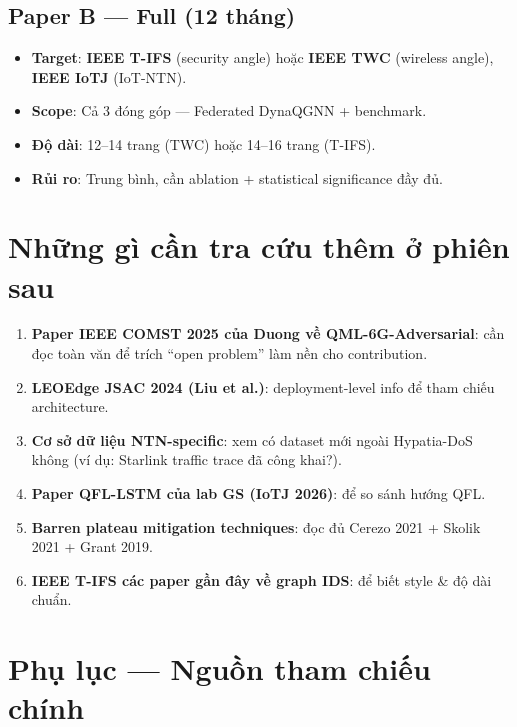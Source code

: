 \documentclass[11pt,a4paper]{article}
\begin{document}
\subsection{Paper B --- Full (12 tháng)}
\begin{itemize}
  \item \textbf{Target}: \textbf{IEEE T-IFS} (security angle) hoặc \textbf{IEEE TWC} (wireless angle), \textbf{IEEE IoTJ} (IoT-NTN).
  \item \textbf{Scope}: Cả 3 đóng góp --- Federated DynaQGNN + benchmark.
  \item \textbf{Độ dài}: 12--14 trang (TWC) hoặc 14--16 trang (T-IFS).
  \item \textbf{Rủi ro}: Trung bình, cần ablation + statistical significance đầy đủ.
\end{itemize}

\section{Những gì cần tra cứu thêm ở phiên sau}

\begin{enumerate}
  \item \textbf{Paper IEEE COMST 2025 của Duong về QML-6G-Adversarial}: cần đọc toàn văn để trích ``open problem'' làm nền cho contribution.
  \item \textbf{LEOEdge JSAC 2024 (Liu et al.)}: deployment-level info để tham chiếu architecture.
  \item \textbf{Cơ sở dữ liệu NTN-specific}: xem có dataset mới ngoài Hypatia-DoS không (ví dụ: Starlink traffic trace đã công khai?).
  \item \textbf{Paper QFL-LSTM của lab GS (IoTJ 2026)}: để so sánh hướng QFL.
  \item \textbf{Barren plateau mitigation techniques}: đọc đủ Cerezo 2021 + Skolik 2021 + Grant 2019.
  \item \textbf{IEEE T-IFS các paper gần đây về graph IDS}: để biết style \& độ dài chuẩn.
\end{enumerate}

\section*{Phụ lục --- Nguồn tham chiếu chính}
\end{document}
